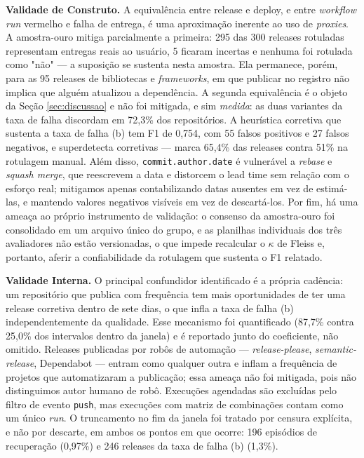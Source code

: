 \textbf{Validade de Construto.} A equivalência entre release e deploy, e entre
\emph{workflow run} vermelho e falha de entrega, é uma aproximação inerente ao uso de
\emph{proxies}. A amostra-ouro mitiga parcialmente a primeira: 295 das 300 releases
rotuladas representam entregas reais ao usuário, 5 ficaram incertas e nenhuma foi rotulada
como "não" --- a suposição se sustenta nesta amostra. Ela permanece, porém, para as 95
releases de bibliotecas e \emph{frameworks}, em que publicar no registro não implica que
alguém atualizou a dependência. A segunda equivalência é o objeto da Seção
\ref{sec:discussao} e não foi mitigada, e sim \emph{medida}: as duas variantes da taxa de falha
discordam em 72,3\% dos repositórios. A heurística corretiva que sustenta a taxa de falha (b) tem
F1 de 0,754, com 55 falsos positivos e 27 falsos negativos, e superdetecta corretivas ---
marca 65,4\% das releases contra 51\% na rotulagem manual. Além disso,
\texttt{commit.author.date} é vulnerável a \emph{rebase} e \emph{squash merge}, que reescrevem
a data e distorcem o lead time sem relação com o esforço real; mitigamos apenas
contabilizando datas ausentes em vez de estimá-las, e mantendo valores negativos visíveis em
vez de descartá-los. Por fim, há uma ameaça ao próprio instrumento de validação: o consenso
da amostra-ouro foi consolidado em um arquivo único do grupo, e as planilhas individuais dos
três avaliadores não estão versionadas, o que impede recalcular o $\kappa$ de Fleiss e,
portanto, aferir a confiabilidade da rotulagem que sustenta o F1 relatado.

\textbf{Validade Interna.} O principal confundidor identificado é a própria cadência: um
repositório que publica com frequência tem mais oportunidades de ter uma release corretiva
dentro de sete dias, o que infla a taxa de falha (b) independentemente da qualidade. Esse mecanismo
foi quantificado (87,7\% contra 25,0\% dos intervalos dentro da janela) e é reportado junto
do coeficiente, não omitido. Releases publicadas por robôs de automação ---
\emph{release-please}, \emph{semantic-release}, Dependabot --- entram como qualquer outra e
inflam a frequência de projetos que automatizaram a publicação; essa ameaça não foi mitigada,
pois não distinguimos autor humano de robô. Execuções agendadas são excluídas pelo filtro de
evento \texttt{push}, mas execuções com matriz de combinações contam como um único
\emph{run}. O truncamento no fim da janela foi tratado por censura explícita, e não por
descarte, em ambos os pontos em que ocorre: 196 episódios de recuperação (0,97\%) e 246
releases da taxa de falha (b) (1,3\%).

